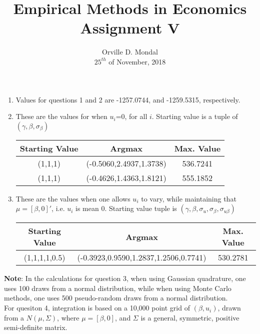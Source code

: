 \documentclass[12pt,a4paper]{article}
\title{Empirical Methods in Economics\\\small{Assignment V}}
\date{Orville D. Mondal\\ $25^{th}$ of November, 2018\vspace{-3ex}}
\begin{document}
\maketitle
\begin{enumerate}[1.]
\item Values for questions 1 and 2 are -1257.0744, and -1259.5315, respectively.
\item These are the values for when $u_{i}$=0, for all $i$. Starting value is a tuple of $(\gamma,\beta,\sigma_{\beta})$
\begin{center}\begin{tabular}{c c c }
\hline \hline\vspace{2mm}
Starting Value & Argmax &Max. Value\\
\hline
(1,1,1)& (-0.5060,2.4937,1.3738) & 536.7241\\
(1,1,1) & (-0.4626,1.4363,1.8121) & 555.1852
\end{tabular}
\end{center}
\item These are the values when one allows $u_i$ to vary, while maintaining that $\mu=[\beta,0]'$, i.e. $u_i$ is mean 0. Starting value tuple is $(\gamma,\beta,\sigma_{u},\sigma_\beta,\sigma_{u\beta})$
\begin{center}\begin{tabular}{c c c }
\hline \hline\vspace{2mm}
Starting Value & Argmax &Max. Value\\
\hline
(1,1,1,1,0.5)& (-0.3923,0.9590,1.2837,1.2506,0.7741) & 530.2781
\end{tabular}
\end{center}

\end{enumerate}
\textbf{Note}: In the calculations for question 3, when using Gaussian quadrature, one uses 100 draws from a normal distribution, while when using Monte Carlo methods, one uses 500 pseudo-random draws from a normal distribution. \\For quesiton 4, integration is based on a 10,000 point grid of $(\beta,u_i)$, drawn from a $N(\mu,\Sigma)$, where $\mu=[\beta,0]$, and $\Sigma$ is a general, symmetric, positive semi-definite matrix.
\end{document}
